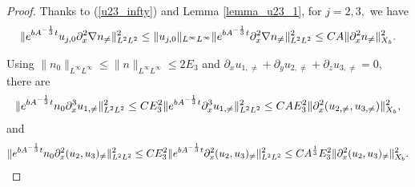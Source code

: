 \documentclass[12pt, reqno]{amsart}
\numberwithin{equation}{section}
\begin{document}
\begin{proof}
		 Thanks to (\ref{u23_infty}) and Lemma \ref{lemma_u23_1}, for $j=2,3,$ we have
		\begin{equation*}
			\begin{aligned}
				{\|{\rm e}^{bA^{-\frac{1}{3}}t}u_{j,0}\partial_x^2\nabla n_{\neq}\|_{L^2L^2}^2}
				\leq 	{\|u_{j,0}\|_{L^{\infty}L^{\infty}}\|{\rm e}^{bA^{-\frac{1}{3}}t}\partial_x^2\nabla n_{\neq}\|_{L^2L^2}^2}
				\leq CA\|\partial_x^2n_{\neq}\|^2_{X_b}.
			\end{aligned}
		\end{equation*}
		
		 Using $\|n_0\|_{L^{\infty}L^{\infty}}\leq \|n\|_{L^{\infty}L^{\infty}}\leq 2E_3$ and $\partial_xu_{1,\neq}+\partial_yu_{2,\neq}+\partial_zu_{3,\neq}=0$, there are
		\begin{equation*}
			\begin{aligned}
				{\|{\rm e}^{bA^{-\frac{1}{3}}t}n_{0}\partial_x^3u_{1,\neq}\|_{L^2L^2}^2}
				\leq {CE_3^2\|{\rm e}^{bA^{-\frac{1}{3}}t}\partial_x^3u_{1,\neq}\|_{L^2L^2}^2}
				\leq {CAE_3^2\|\partial_x^2(u_{2,\neq},u_{3,\neq})\|^2_{X_b}},
			\end{aligned}
		\end{equation*}
		and	\begin{equation*}
			\begin{aligned}
				\|{\rm e}^{bA^{-\frac{1}{3}}t}n_{0}
				\partial_x^2(u_{2},u_{3})_{\neq}\|_{L^2L^2}^2
				\leq CE_3^2\|{\rm e}^{bA^{-\frac{1}{3}}t}
				\partial_x^2(u_{2},u_{3})_{\neq}\|_{L^2L^2}^2
				\leq CA^{\frac13}E_3^2\|\partial_x^2(u_2,u_3)_{\neq}\|^2_{X_b}.
			\end{aligned}
		\end{equation*}
		
		
		

\end{proof}
\end{document}
